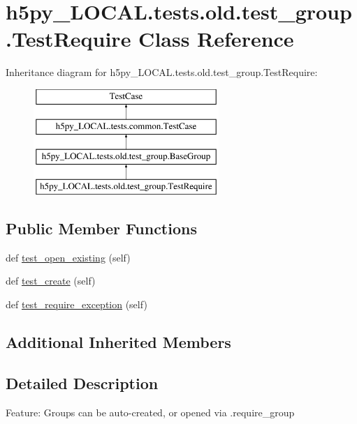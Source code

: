 \hypertarget{classh5py__LOCAL_1_1tests_1_1old_1_1test__group_1_1TestRequire}{}\section{h5py\+\_\+\+L\+O\+C\+A\+L.\+tests.\+old.\+test\+\_\+group.\+Test\+Require Class Reference}
\label{classh5py__LOCAL_1_1tests_1_1old_1_1test__group_1_1TestRequire}
Inheritance diagram for h5py\+\_\+\+L\+O\+C\+A\+L.\+tests.\+old.\+test\+\_\+group.\+Test\+Require\+:\begin{figure}[H]
\begin{center}
\leavevmode
\includegraphics[height=4.000000cm]{classh5py__LOCAL_1_1tests_1_1old_1_1test__group_1_1TestRequire}
\end{center}
\end{figure}
\subsection*{Public Member Functions}
\begin{DoxyCompactItemize}
\item 
def \hyperlink{classh5py__LOCAL_1_1tests_1_1old_1_1test__group_1_1TestRequire_a5dafe0e2ba2f87f09367d77d40d917c6}{test\+\_\+open\+\_\+existing} (self)
\item 
def \hyperlink{classh5py__LOCAL_1_1tests_1_1old_1_1test__group_1_1TestRequire_a11a36cf119c57991b0f0b42f038709fb}{test\+\_\+create} (self)
\item 
def \hyperlink{classh5py__LOCAL_1_1tests_1_1old_1_1test__group_1_1TestRequire_a0efeed3bfbd45601a631dd9b98f9c3e9}{test\+\_\+require\+\_\+exception} (self)
\end{DoxyCompactItemize}
\subsection*{Additional Inherited Members}


\subsection{Detailed Description}
\begin{DoxyVerb}    Feature: Groups can be auto-created, or opened via .require_group
\end{DoxyVerb}
 

